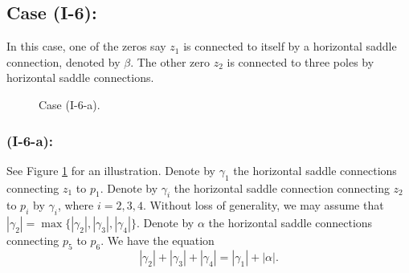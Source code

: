 \documentclass[11pt]{amsart}
\theoremstyle{plain}
\begin{document}
\subsection*{Case \textbf{(I-6):}} In this case,
one of the zeros say $z_1$ is connected to itself by a horizontal saddle connection, 
denoted by $\beta$. The other zero $z_2$ is connected to three poles by horizontal saddle connections.



\begin{figure}[h]
    \centering

\caption{Case (I-6-a). }
       \label{fig:I-7-1} 
\end{figure}




\subsubsection*{\textbf{(I-6-a):}} See Figure \ref{fig:I-7-1} for an illustration. 
Denote by $\gamma_1$ the horizontal saddle connections connecting $z_1$ 
to $p_1$. 
Denote by $\gamma_i$ the horizontal saddle connection connecting $z_2$ to $p_i$ 
by $\gamma_i$, where $i=2,3,4$. 
Without loss of generality, we may assume that 
$|\gamma_2| = \max\{ |\gamma_2|, |\gamma_3|, |\gamma_4|\}.$
Denote by $\alpha$ the horizontal saddle connections connecting $p_5$ 
to $p_6$. 
We have the equation
\begin{equation}\label{equ:length}
  |\gamma_2|+|\gamma_3|+|\gamma_4| = |\gamma_1| + |\alpha|.
\end{equation}
\end{document}
